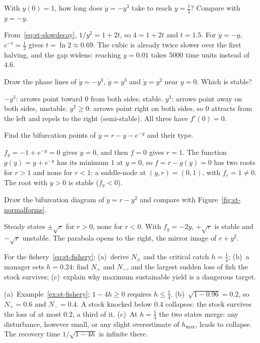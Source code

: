 \label{exo:st-slow}
%
With $y(0) = 1$, how long does $\dot y = -y^3$ take to reach $y = \tfrac12$?
Compare with $\dot y = -y$.
\begin{solution}
From~\eqref{eq:st-slowdecay}, $1/y^2 = 1 + 2t$, so $4 = 1 + 2t$ and $t = 1.5$. For
$\dot y = -y$, $e^{-t} = \tfrac12$ gives $t = \ln 2 \approx 0.69$. The cubic is
already twice slower over the first halving, and the gap widens: reaching
$y = 0.01$ takes $5000$ time units instead of $4.6$.
\end{solution}

\label{exo:st-silent}
Draw the phase lines of $\dot y = -y^3$, $\dot y = y^3$ and $\dot y = y^2$ near
$y = 0$. Which is stable?
\begin{solution}
$-y^3$: arrows point toward $0$ from both sides, stable. $y^3$: arrows point away
on both sides, unstable. $y^2 \ge 0$: arrows point right on both sides, so $0$
attracts from the left and repels to the right (semi-stable). All three have
$f'(0) = 0$.
\end{solution}

\label{exo:st-disguise}
%
Find the bifurcation points of $\dot y = r - y - e^{-y}$ and their type.
\begin{solution}
$f_y = -1 + e^{-y} = 0$ gives $y = 0$, and then $f = 0$ gives $r = 1$. The function
$g(y) = y + e^{-y}$ has its minimum $1$ at $y = 0$, so $f = r - g(y) = 0$ has two
roots for $r > 1$ and none for $r < 1$: a saddle-node at $(y,r) = (0,1)$, with
$f_r = 1 \neq 0$. The root with $y > 0$ is stable ($f_y < 0$).
\end{solution}

\label{exo:st-open}
Draw the bifurcation diagram of $\dot y = r - y^2$ and compare with
Figure~\ref{fig:st-normalforms}.
\begin{solution}
Steady states $\pm\sqrt r$ for $r > 0$, none for $r < 0$. With $f_y = -2y$,
$+\sqrt r$ is stable and $-\sqrt r$ unstable. The parabola opens to the right,
the mirror image of $r + y^2$.
\end{solution}


\label{exo:st-fishery}
%
For the fishery~\eqref{eq:st-fishery}:
(a)~derive $N_\pm$ and the critical catch $h = \tfrac14$;
(b)~a manager sets $h = 0.24$: find $N_+$ and $N_-$, and the largest sudden loss
of fish the stock survives;
(c)~explain why maximum sustainable yield is a dangerous target.
\begin{solution}
(a)~Example~\ref{ex:st-fishery}; $1 - 4h \ge 0$ requires $h \le \tfrac14$.
(b)~$\sqrt{1 - 0.96} = 0.2$, so $N_+ = 0.6$ and $N_- = 0.4$. A stock knocked below
$0.4$ collapses: the stock survives the loss of at most $0.2$, a third of it.
(c)~At $h = \tfrac14$ the two states merge: any disturbance, however small, or any
slight overestimate of $h_{\max}$, leads to collapse. The recovery time
$1/\sqrt{1-4h}$ is infinite there.
\end{solution}

